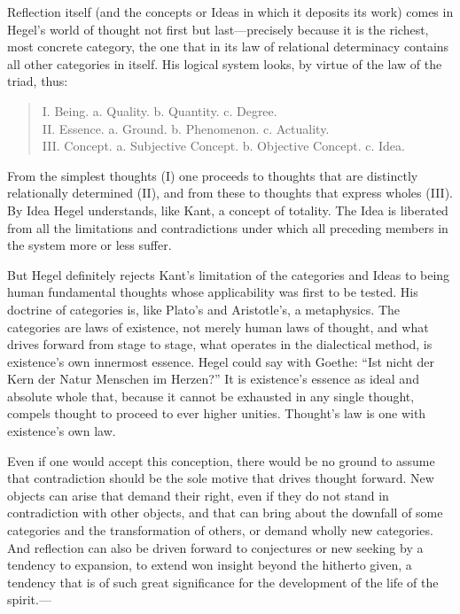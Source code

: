 \documentclass[12pt,a4paper]{book}
\newcommand{\opage}[1]{\marginnote{\footnotesize\textit{[#1]}}}
\begin{document}
Reflection itself (and the concepts or Ideas in which it deposits its work)
comes in Hegel's world of thought not first but last---precisely because it
is the richest, most \opage{149}concrete category, the one that in its law of
relational determinacy contains all other categories in itself. His logical
system looks, by virtue of the law of the triad, thus:

\begin{quote}
I. Being. a. Quality. b. Quantity. c. Degree.\\
II. Essence. a. Ground. b. Phenomenon. c. Actuality.\\
III. Concept. a. Subjective Concept. b. Objective Concept. c. Idea.
\end{quote}

From the simplest thoughts (I) one proceeds to thoughts that are distinctly
relationally determined (II), and from these to thoughts that express wholes
(III). By Idea Hegel understands, like Kant, a concept of totality. The Idea
is liberated from all the limitations and contradictions under which all
preceding members in the system more or less suffer.

But Hegel definitely rejects Kant's limitation of the categories and Ideas
to being human fundamental thoughts whose applicability was first to be
tested. His doctrine of categories is, like Plato's and Aristotle's, a
metaphysics. The categories are laws of existence, not merely human laws of
thought, and what drives forward from stage to stage, what operates in the
dialectical method, is existence's own innermost essence. Hegel could say
with Goethe: ``Ist nicht der Kern der Natur Menschen im Herzen?'' It is
existence's essence as ideal and absolute whole that, because it cannot be
exhausted in any single thought, compels thought to proceed to ever higher
unities. Thought's law is one with existence's own law.

Even if one would accept this conception, there would be no ground to assume
that contradiction should be the sole motive that drives thought forward. New
objects can arise that demand their right, even if they do not stand in
contradiction with other objects, and that can bring about the downfall of
some categories and the transformation of others, or demand wholly new
categories. And reflection can also be driven forward to conjectures or new
seeking by a tendency to expansion, to extend won insight beyond the hitherto
given, a tendency that is of such great significance for the development of
the life of the spirit.---
\end{document}
